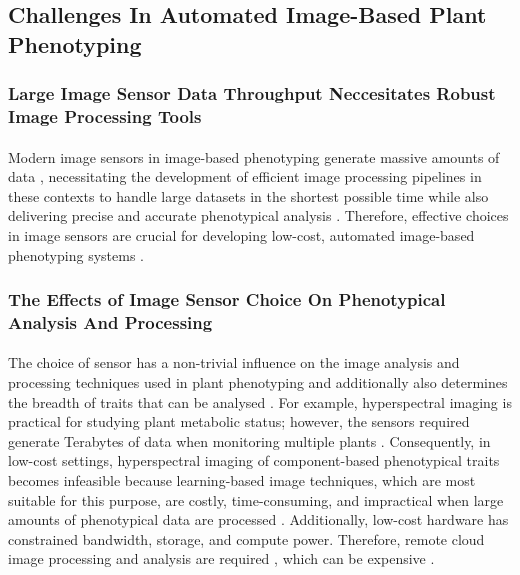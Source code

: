 \subsection{Challenges  In Automated Image-Based Plant Phenotyping}

\subsubsection{Large Image Sensor Data Throughput Neccesitates Robust Image Processing Tools}
\paragraph{}
Modern image sensors in image-based phenotyping generate massive amounts of data \cite{gomesComputationalSustainabilityComputational2009}, necessitating the development of efficient image processing pipelines in these contexts to handle large datasets in the shortest possible time while also delivering precise and accurate phenotypical analysis \cite{minerviniImageAnalysisNew2015}.  Therefore, effective choices in image sensors are crucial for developing low-cost, automated image-based phenotyping systems \cite{zhangHighthroughputPhenotypingPlant2023}.

\subsubsection{The Effects of Image Sensor Choice On Phenotypical Analysis And Processing}
\paragraph{}
The choice of sensor has a non-trivial influence on the image analysis and processing techniques used in plant phenotyping and additionally also determines the breadth of traits that can be analysed \cite{liReviewImagingTechniques2014}. For example, hyperspectral imaging is practical for studying plant metabolic status; however, the sensors required generate Terabytes of data when monitoring multiple plants \cite{bauckhageDataMiningPattern2013}. Consequently, in low-cost settings, hyperspectral imaging of component-based phenotypical traits becomes infeasible because learning-based image techniques, which are most suitable for this purpose, are costly, time-consuming, and impractical when large amounts of phenotypical data are processed \cite{bauckhageDataMiningPattern2013}. Additionally, low-cost hardware has constrained bandwidth, storage, and compute power. Therefore, remote cloud image processing and analysis are required \cite{debaucheCloudArchitecturePlant2020}, which can be expensive \cite{minerviniImageAnalysisNew2015}.

